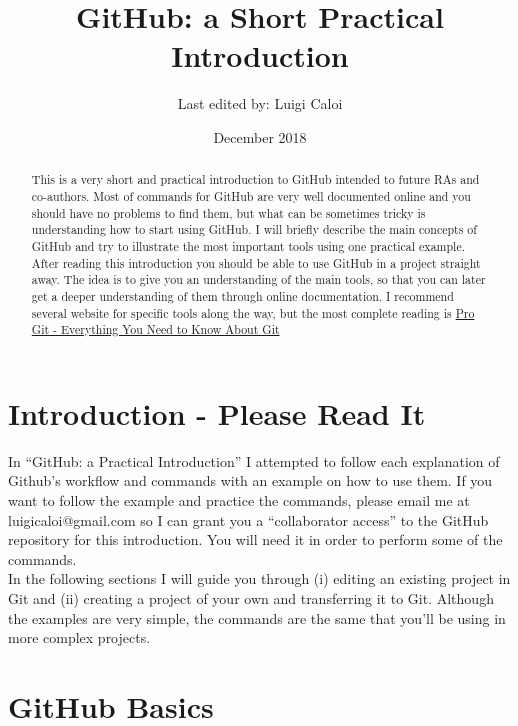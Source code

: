 \documentclass{article}
\title{GitHub: a Short Practical Introduction}
\author{Last edited by: Luigi Caloi}
\date{December 2018}
\begin{document}
\maketitle
\tableofcontents

\begin{abstract} 
	This is a very short and practical introduction to GitHub intended to future RAs and co-authors. Most of commands for GitHub are very well documented online and you should have no problems to find them, but what can be sometimes tricky is understanding how to start using GitHub. I will briefly describe the main concepts of GitHub and try to illustrate the most important tools using one practical example. After reading this introduction you should be able to use GitHub in a project straight away. The idea is to give you an understanding of the main tools, so that you can later get a deeper understanding of them through online documentation. I recommend several website for specific tools along the way, but the most complete reading is \href{https://git-scm.com/book/en/v2}{Pro Git - Everything You Need to Know About Git} %
\end{abstract}

\section{Introduction - Please Read It}
	 
    In ``GitHub: a Practical Introduction'' I attempted to follow each explanation of Github's workflow and commands with an example on how to use them. If you want to follow the example and practice the commands, please email me at luigicaloi@gmail.com so I can grant you a ``collaborator access'' to the GitHub repository for this introduction. You will need it in order to perform some of the commands. \\
    \newline
    In the following sections I will guide you through (i) editing an existing project in Git and (ii) creating a project of your own and transferring it to Git. Although the examples are very simple, the commands are the same that you'll be using in more complex projects.
    
\section{GitHub Basics}
\end{document}
